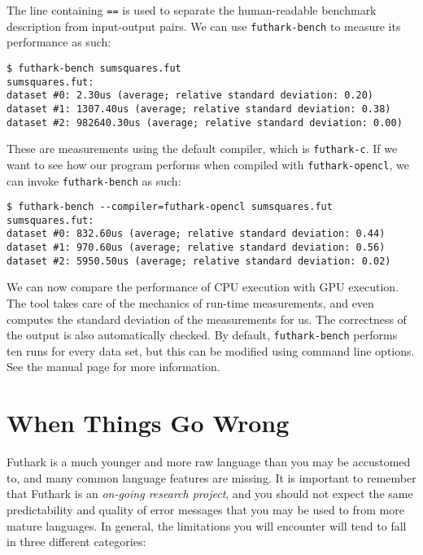 \documentclass[oneside,11pt]{book}
\newenvironment{wrap}{\vspace{\topskip}\par\noindent\begin{minipage}{\linewidth}}{\end{minipage}\par}
\newcommand{\inplisting}[1]{\begin{wrap}\end{wrap}}
\begin{document}
\inplisting{src/sumsquares.fut}

The line containing \texttt{==} is used to separate the human-readable
benchmark description from input-output pairs.  We can use
\texttt{futhark-bench} to measure its performance as such:

\begin{verbatim}
$ futhark-bench sumsquares.fut
sumsquares.fut:
dataset #0: 2.30us (average; relative standard deviation: 0.20)
dataset #1: 1307.40us (average; relative standard deviation: 0.38)
dataset #2: 982640.30us (average; relative standard deviation: 0.00)
\end{verbatim}

These are measurements using the default compiler, which is
\texttt{futhark-c}.  If we want to see how our program performs when
compiled with \texttt{futhark-opencl}, we can invoke
\texttt{futhark-bench} as such:

\begin{verbatim}
$ futhark-bench --compiler=futhark-opencl sumsquares.fut
sumsquares.fut:
dataset #0: 832.60us (average; relative standard deviation: 0.44)
dataset #1: 970.60us (average; relative standard deviation: 0.56)
dataset #2: 5950.50us (average; relative standard deviation: 0.02)
\end{verbatim}

We can now compare the performance of CPU execution with GPU
execution.  The tool takes care of the mechanics of run-time
measurements, and even computes the standard deviation of the
measurements for us.  The correctness of the output is also
automatically checked.  By default, \texttt{futhark-bench} performs
ten runs for every data set, but this can be modified using command
line options.  See the manual page for more information.

\section{When Things Go Wrong}

Futhark is a much younger and more raw language than you may be
accustomed to, and many common language features are missing.  It is
important to remember that Futhark is an \textit{on-going research
  project}, and you should not expect the same predictability and
quality of error messages that you may be used to from more mature
languages.  In general, the limitations you will encounter will tend
to fall in three different categories:
\end{document}
